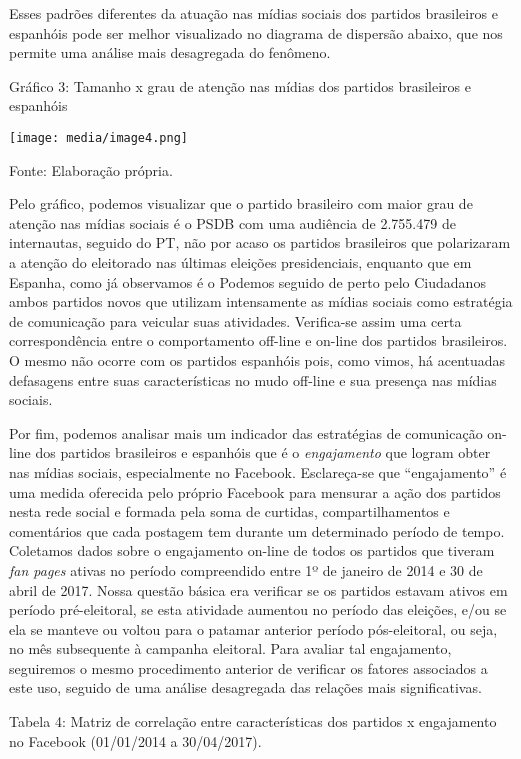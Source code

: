 Esses padrões diferentes da atuação nas mídias sociais dos partidos
brasileiros e espanhóis pode ser melhor visualizado no diagrama de
dispersão abaixo, que nos permite uma análise mais desagregada do
fenômeno.

Gráfico 3: Tamanho x grau de atenção nas mídias dos partidos brasileiros
e espanhóis

\texttt{[image: media/image4.png]}

Fonte: Elaboração própria.

Pelo gráfico, podemos visualizar que o partido brasileiro com maior grau
de atenção nas mídias sociais é o PSDB com uma audiência de 2.755.479 de
internautas, seguido do PT, não por acaso os partidos brasileiros que
polarizaram a atenção do eleitorado nas últimas eleições presidenciais,
enquanto que em Espanha, como já observamos é o Podemos seguido de perto
pelo Ciudadanos ambos partidos novos que utilizam intensamente as mídias
sociais como estratégia de comunicação para veicular suas atividades.
Verifica-se assim uma certa correspondência entre o comportamento
off-line e on-line dos partidos brasileiros. O mesmo não ocorre com os
partidos espanhóis pois, como vimos, há acentuadas defasagens entre suas
características no mudo off-line e sua presença nas mídias sociais.

Por fim, podemos analisar mais um indicador das estratégias de
comunicação on-line dos partidos brasileiros e espanhóis que é o
\emph{engajamento} que logram obter nas mídias sociais, especialmente no
Facebook. Esclareça-se que ``engajamento'' é uma medida oferecida pelo
próprio Facebook para mensurar a ação dos partidos nesta rede social e
formada pela soma de curtidas, compartilhamentos e comentários que cada
postagem tem durante um determinado período de tempo. Coletamos dados
sobre o engajamento on-line de todos os partidos que tiveram \emph{fan
pages} ativas no período compreendido entre 1º de janeiro de 2014 e 30
de abril de 2017. Nossa questão básica era verificar se os partidos
estavam ativos em período pré-eleitoral, se esta atividade aumentou no
período das eleições, e/ou se ela se manteve ou voltou para o patamar
anterior período pós-eleitoral, ou seja, no mês subsequente à campanha
eleitoral. Para avaliar tal engajamento, seguiremos o mesmo procedimento
anterior de verificar os fatores associados a este uso, seguido de uma
análise desagregada das relações mais significativas.

Tabela 4: Matriz de correlação entre características dos partidos x
engajamento no Facebook (01/01/2014 a 30/04/2017).

